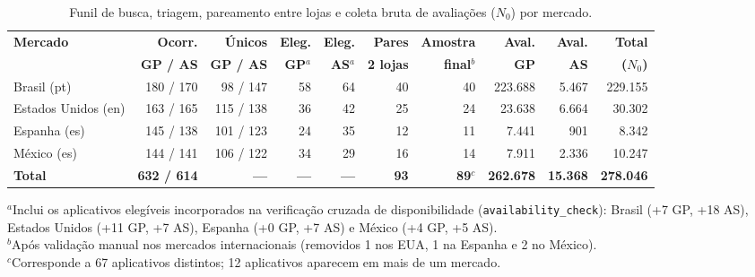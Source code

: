 \begin{table}[htbp]
\centering
\caption{Funil de busca, triagem, pareamento entre lojas e coleta bruta de avaliações ($N_0$) por mercado.}
\label{tab:coleta}
\footnotesize
\setlength{\tabcolsep}{3.5pt}
\begin{tabular}{lrrrrrrrrr}
\toprule
\textbf{Mercado} & \textbf{Ocorr.} & \textbf{Únicos} & \textbf{Eleg.} & \textbf{Eleg.} & \textbf{Pares} & \textbf{Amostra} & \textbf{Aval.} & \textbf{Aval.} & \textbf{Total} \\
 & \textbf{GP / AS} & \textbf{GP / AS} & \textbf{GP}$^a$ & \textbf{AS}$^a$ & \textbf{2 lojas} & \textbf{final}$^b$ & \textbf{GP} & \textbf{AS} & \textbf{($N_0$)} \\
\midrule
Brasil (pt)         & 180 / 170 &  98 / 147 & 58 & 64 & 40 & 40 & 223.688 &  5.467 & 229.155 \\
Estados Unidos (en) & 163 / 165 & 115 / 138 & 36 & 42 & 25 & 24 &  23.638 &  6.664 &  30.302 \\
Espanha (es)        & 145 / 138 & 101 / 123 & 24 & 35 & 12 & 11 &   7.441 &    901 &   8.342 \\
México (es)         & 144 / 141 & 106 / 122 & 34 & 29 & 16 & 14 &   7.911 &  2.336 &  10.247 \\
\midrule
\textbf{Total}      & \textbf{632 / 614} & \textbf{---} & \textbf{---} & \textbf{---} & \textbf{93} & \textbf{89}$^c$ & \textbf{262.678} & \textbf{15.368} & \textbf{278.046} \\
\bottomrule
\end{tabular}

\smallskip
\raggedright\scriptsize
$^a$Inclui os aplicativos elegíveis incorporados na verificação cruzada de disponibilidade (\texttt{availability\_check}): Brasil (+7 GP, +18 AS), Estados Unidos (+11 GP, +7 AS), Espanha (+0 GP, +7 AS) e México (+4 GP, +5 AS).\\
$^b$Após validação manual nos mercados internacionais (removidos 1 nos EUA, 1 na Espanha e 2 no México).\\
$^c$Corresponde a 67 aplicativos distintos; 12 aplicativos aparecem em mais de um mercado.
\end{table}

